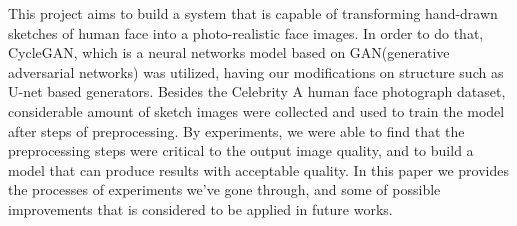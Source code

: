 
This project aims to build a system that is capable of transforming hand-drawn sketches of human face into a photo-realistic face images. In order to do that, CycleGAN, which is a neural networks model based on GAN(generative adversarial networks) was utilized, having our modifications on structure such as U-net based generators. Besides the Celebrity A human face photograph dataset, considerable amount of sketch images were collected and used to train the model after steps of preprocessing. By experiments, we were able to find that the preprocessing steps were critical to the output image quality, and to build a model that can produce results with acceptable quality. In this paper we provides the processes of experiments we've gone through, and some of possible improvements that is considered to be applied in future works.

